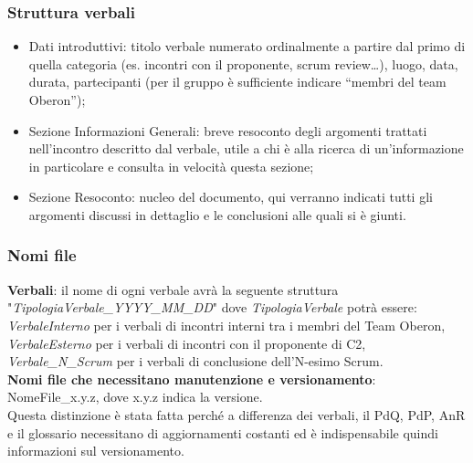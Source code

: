 \subsubsection{Struttura verbali}
\begin{itemize}
    \item Dati introduttivi: titolo verbale numerato ordinalmente a partire dal primo di quella categoria (es. incontri con il proponente, scrum review…), luogo, data, durata, partecipanti (per il gruppo è sufficiente indicare “membri del team Oberon”);
    \item Sezione Informazioni Generali: breve resoconto degli argomenti trattati nell'incontro descritto dal verbale, utile a chi è alla ricerca di un’informazione in particolare e consulta in velocità questa sezione; 
    \item Sezione Resoconto: nucleo del documento, qui verranno indicati tutti gli argomenti discussi in dettaglio e le conclusioni alle quali si è giunti.

\end{itemize}

\subsubsection{Nomi file}
\textbf{Verbali}: il nome di ogni verbale avrà la seguente struttura "\textit{TipologiaVerbale\_YYYY\_MM\_DD}" dove \textit{TipologiaVerbale} potrà essere: \textit{VerbaleInterno} per i verbali di incontri interni tra i membri del Team Oberon, \textit{VerbaleEsterno} per i verbali di incontri con il proponente di C2, \textit{Verbale\_N\_Scrum} per i verbali di conclusione dell'N-esimo Scrum.\\
\textbf{Nomi file che necessitano manutenzione e versionamento}:\\ NomeFile\_x.y.z, dove x.y.z indica la versione.\\
Questa distinzione è stata fatta perché a differenza dei verbali, il PdQ, PdP, AnR e il glossario necessitano di aggiornamenti costanti ed è indispensabile quindi informazioni sul versionamento.

